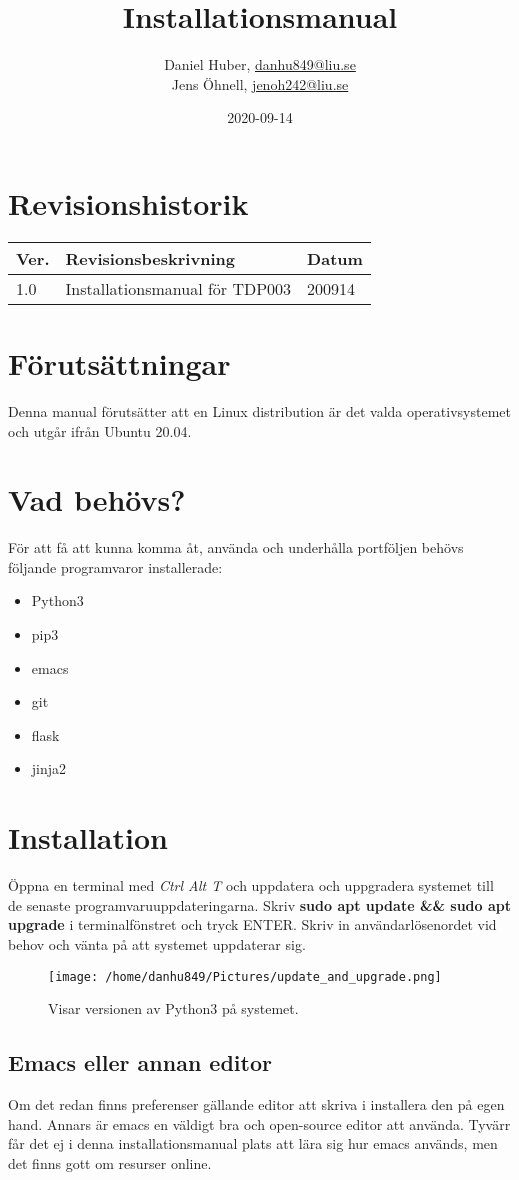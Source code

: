 \documentclass{TDP003mall}
\author{Daniel Huber, \url{danhu849@liu.se}\\
  Jens Öhnell, \url{jenoh242@liu.se}}
\title{Installationsmanual}
\date{2020-09-14}
\begin{document}
\projectpage
\section{Revisionshistorik}
\begin{table}[!h]
\begin{tabularx}{\linewidth}{|l|X|l|}
\hline
Ver. & Revisionsbeskrivning & Datum \\\hline
1.0 & Installationsmanual för TDP003 & 200914 \\\hline
\end{tabularx}
\end{table}

\section{Förutsättningar}
Denna manual förutsätter att en Linux distribution är det valda operativsystemet och utgår ifrån Ubuntu 20.04.

\section{Vad behövs?}
För att få att kunna komma åt, använda och underhålla portföljen behövs följande programvaror installerade:
\begin{itemize}
  \item Python3
  \item pip3
  \item emacs
  \item git
  \item flask
  \item jinja2   
\end{itemize}

\section{Installation}
Öppna en terminal med \emph{Ctrl Alt T} och uppdatera och uppgradera systemet till de senaste programvaruuppdateringarna. Skriv \textbf{sudo apt update \&\& sudo apt upgrade} i terminalfönstret och tryck ENTER. Skriv in användarlösenordet vid behov och vänta på att systemet uppdaterar sig.
\begin{figure}[htbp]
  \centerline{\texttt{[image: /home/danhu849/Pictures/update\_and\_upgrade.png]}}
  \caption{Visar versionen av Python3 på systemet.}
  \label{fig}
\end{figure}

\subsection{Emacs eller annan editor}
Om det redan finns preferenser gällande editor att skriva i installera den på egen hand. Annars är emacs en väldigt bra och open-source editor att använda. Tyvärr får det ej i denna installationsmanual plats att lära sig hur emacs används, men det finns gott om resurser online.
\end{document}
